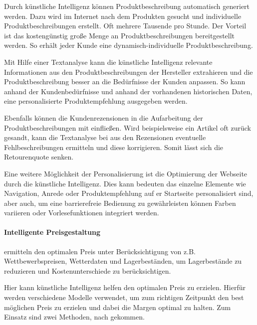 Durch künstliche Intelligenz können Produktbeschreibung automatisch generiert werden. Dazu wird im Internet nach dem Produkten gesucht und individuelle Produktbeschreibungen erstellt. Oft mehrere Tausende pro Stunde. Der Vorteil ist das kostengünstig große Menge an Produktbeschreibungen bereitgestellt werden. So erhält jeder Kunde eine dynamisch-individuelle Produktbeschreibung.\vspace{0.2cm}

Mit Hilfe einer Textanalyse kann die künstliche Intelligenz relevante Informationen aus den Produktbeschreibungen der Hersteller extrahieren und die Produktbeschreibung besser an die Bedürfnisse der Kunden anpassen. So kann anhand der Kundenbedürfnisse und anhand der vorhandenen historischen Daten, eine personalisierte Produktempfehlung ausgegeben werden.\vspace{0.2cm}

Ebenfalls können die Kundenrezensionen in die Aufarbeitung der Produktbeschreibungen mit einfließen. Wird beispielsweise ein Artikel oft zurück gesandt, kann die Textanalyse bei  aus den Rezensionen eventuelle Fehlbeschreibungen ermitteln und diese korrigieren. Somit lässt sich die Retourenquote senken.\vspace{0.2cm}

Eine weitere Möglichkeit der Personalisierung ist die Optimierung der Webseite durch die künstliche Intelligenz. Dies kann bedeuten das einzelne Elemente wie Navigation, Anrede oder Produktempfehlung auf er Startseite personalisiert sind, aber auch, um eine barrierefreie Bedienung zu gewährleisten können Farben variieren oder Vorlesefunktionen integriert werden.

\paragraph{Intelligente Preisgestaltung} ermitteln den optimalen Preis unter Berücksichtigung von z.B. Wettbewerbspreisen, Wetterdaten und Lagerbeständen, um Lagerbestände zu reduzieren und Kostenunterschiede zu berücksichtigen.\vspace{0.2cm}

Hier kann künstliche Intelligenz helfen den optimalen Preis zu erzielen. Hierfür werden verschiedene Modelle verwendet, um zum richtigen Zeitpunkt den best möglichen Preis zu erzielen und dabei die Margen optimal zu halten. Zum Einsatz sind zwei Methoden, nach \cite{mckinsey_dynamic_pricing} gekommen.\vspace{0.2cm}


